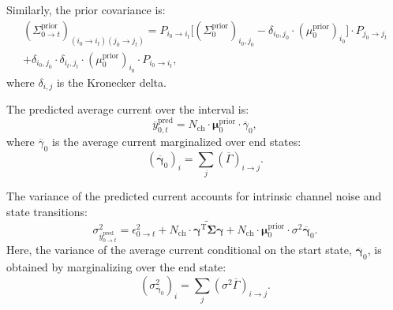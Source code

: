 \documentclass[pdflatex,sn-mathphys-num]{sn-jnl}%
\theoremstyle{thmstyleone}%
\theoremstyle{thmstyletwo}%
\theoremstyle{thmstylethree}%
\begin{document}
Similarly, the prior covariance is:
\begin{multline}
	(\Sigma^{\text{prior}}_{0 \rightarrow t})_{(i_0 \rightarrow i_t)(j_0 \rightarrow j_t)} = 
	P_{i_0 \rightarrow i_t} \big[(\Sigma^{\text{prior}}_0)_{i_0, j_0} - \delta_{i_0, j_0} \cdot (\mu^{\text{prior}}_0)_{i_0} \big] \cdot P_{j_0 \rightarrow j_t} \\
	+ \delta_{i_0, j_0} \cdot \delta_{i_t, j_t} \cdot (\mu^{\text{prior}}_0)_{i_0} \cdot P_{i_0 \rightarrow i_t},
	\label{eq:meta_covariance_prior}
\end{multline}
where \( \delta_{i, j} \) is the Kronecker delta.

The predicted average current over the interval is:
\begin{equation}
	\overline{y}^{\text{pred}}_{0,t} = N_{\text{ch}} \cdot \mathbf{\mu}^{\text{prior}}_{0} \cdot \overline{\gamma}_{0},
	\label{eq:macro_interval_predicted_y}
\end{equation}
where \( \overline{\gamma}_{0} \) is the average current marginalized over end states:
\begin{equation}
	(\overline{\mathbf{\gamma}}_{0})_i = \sum_j (\overline{\Gamma})_{i \rightarrow j}.
\end{equation}

The variance of the predicted current accounts for intrinsic channel noise and state transitions:
\begin{equation}
	\sigma^2_{\overline{y}^{\text{pred}}_{0 \rightarrow t}} = \epsilon^2_{0 \rightarrow t} + N_{\text{ch}} \cdot \widetilde{\mathbf{\gamma}^{\mathrm{T}} \mathbf{\Sigma}\mathbf{\gamma}} + 
	N_{\text{ch}} \cdot \mathbf{\mu}^{\mathrm{prior}}_{0} \cdot {\sigma^2 \overline{\mathbf{\gamma}}}_{0}.
	\label{eq:macro_interval_sigma_pred}
\end{equation}
Here, the variance of the average current conditional on the start state, \( \overline{\mathbf{\gamma}}_{0} \), is obtained by marginalizing over the end state:
\begin{equation}
	(\sigma^2_{\overline{\mathbf{\gamma}}_{0}})_i = \sum_j (\sigma^2 \overline{\Gamma})_{i \rightarrow j}.
	\label{eq:sigma_gamma_i}
\end{equation}
\end{document}
